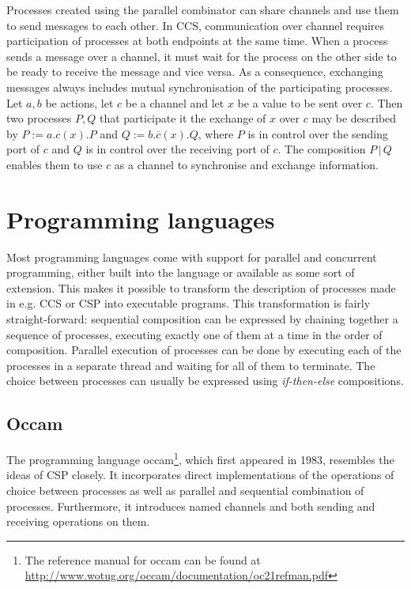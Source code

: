 Processes created using the parallel combinator can share channels and use them to send messages to each other. In \textsc{CCS}, communication over channel requires participation of processes at both endpoints at the same time. When a process sends a message over a channel, it must wait for the process on the other side to be ready to receive the message and vice versa. As a consequence, exchanging messages always includes mutual synchronisation of the participating processes. Let $a, b$ be actions, let $c$ be a channel and let $x$ be a value to be sent over $c$. Then two processes $P, Q$ that participate it the exchange of $x$ over $c$ may be described by $P := a.c\left(x\right).P$ and $Q := b.\overline{c}\left(x\right).Q$, where $P$ is in control over the sending port of $c$ and $Q$ is in control over the receiving port of $c$. The composition $P \,|\, Q$ enables them to use $c$ as a channel to synchronise and exchange information.


\section{Programming languages}
Most programming languages come with support for parallel and concurrent programming, either built into the language or available as some sort of extension. This makes it possible to transform the description of processes made in e.g. \textsc{CCS} or \textsc{CSP} into executable programs. This transformation is fairly straight-forward: sequential composition can be expressed by chaining together a sequence of processes, executing exactly one of them at a time in the order of composition. Parallel execution of processes can be done by executing each of the processes in a separate thread and waiting for all of them to terminate. The choice between processes can usually be expressed using \textit{if-then-else} compositions.

\clearpage
\subsection{Occam}
The programming language \textsf{occam}\footnote{The reference manual for \textsf{occam} can be found at \url{http://www.wotug.org/occam/documentation/oc21refman.pdf}}, which first appeared in 1983, resembles the ideas of CSP closely. It incorporates direct implementations of the operations of choice between processes as well as parallel and sequential combination of processes. Furthermore, it introduces named channels and both sending and receiving operations on them.

